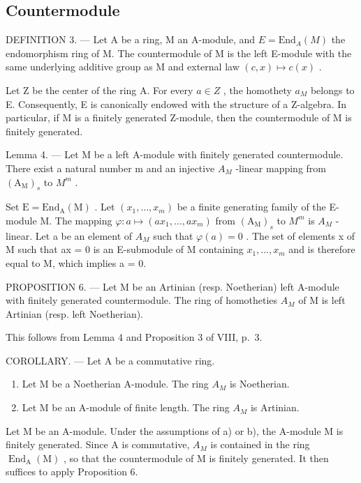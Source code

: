 \subsection{Countermodule}

DEFINITION 3. --- Let A be a ring, M an A-module, and \(E = \text{End}_{A}(M)\) the endomorphism ring of M. The countermodule of M is the left E-module with the same underlying additive group as M and external law \((c, x) \mapsto c(x)\) .

Let Z be the center of the ring A. For every \(a \in Z\) , the homothety \(a_{M}\) belongs to E. Consequently, E is canonically endowed with the structure of a Z-algebra. In particular, if M is a finitely generated Z-module, then the countermodule of M is finitely generated.

Lemma 4. --- Let M be a left A-module with finitely generated countermodule. There exist a natural number m and an injective \(A_{M}\) -linear mapping from \((\mathrm{A}_{\mathrm{M}})_{s}\) to \(M^{m}\) .

Set \(\mathrm{E}=\mathrm{End}_{\mathrm{A}}(\mathrm{M})\) . Let \((x_{1},\ldots,x_{m})\) be a finite generating family of the E-module M. The mapping \(\varphi:a\mapsto(ax_{1},\ldots,ax_{m})\) from \((\mathrm{A}_{\mathrm{M}})_{s}\) to \(M^{m}\) is \(A_{M}\) -linear. Let a be an element of \(A_{M}\) such that \(\varphi(a)=0\) . The set of elements x of M such that ax = 0 is an E-submodule of M containing \(x_{1}, \ldots, x_{m}\) and is therefore equal to M, which implies a = 0.

PROPOSITION 6. --- Let M be an Artinian (resp. Noetherian) left A-module with finitely generated countermodule. The ring of homotheties \(A_{M}\) of M is left Artinian (resp. left Noetherian).

This follows from Lemma 4 and Proposition 3 of VIII, p.~3.

COROLLARY. --- Let A be a commutative ring.

\begin{enumerate}
\def\labelenumi{\alph{enumi})}
\item
  Let M be a Noetherian A-module. The ring \(A_{M}\) is Noetherian.
\item
  Let M be an A-module of finite length. The ring \(A_{M}\) is Artinian.
\end{enumerate}

Let M be an A-module. Under the assumptions of a) or b), the A-module M is finitely generated. Since A is commutative, \(A_{M}\) is contained in the ring \(\operatorname{End}_{\mathrm{A}}(\mathrm{M})\) , so that the countermodule of M is finitely generated. It then suffices to apply Proposition 6.

